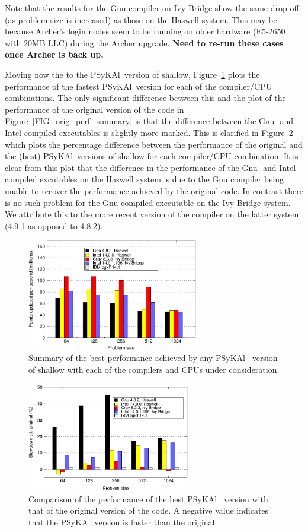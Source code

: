 \documentclass[journal]{IEEEtran}
\newcommand{\psykal}{{PS}y{KA}l\ }
\begin{document}
Note that the results for the Gnu compiler on Ivy Bridge show the same
drop-off (as problem size is increased) as those on the Haswell
system. This may be because Archer's login nodes seem to be running on
older hardware (E5-2650 with 20MB LLC) during the Archer upgrade. {\bf
  Need to re-run these cases once Archer is back up.}

Moving now the to the \psykal version of shallow,
Figure~\ref{FIG_best_psykal_perf_summary} plots the performance of the
fastest \psykal version for each of the compiler/CPU combinations. The
only significant difference between this and the plot of the
performance of the original version of the code in
Figure~\ref{FIG_orig_perf_summary} is that the difference between the
Gnu- and Intel-compiled executables is slightly more marked. This is
clarified in Figure~\ref{FIG_slowdown_summary} which plots the
percentage difference between the performance of the original and the
(best) \psykal versions of shallow for each compiler/CPU combination.
It is clear from this plot that the difference in the performance of
the Gnu- and Intel-compiled excutables on the Haswell system is due to
the Gnu compiler being unable to recover the performance achieved by
the original code. In contrast there is no such problem for the
Gnu-compiled executable on the Ivy Bridge system. We attribute this to
the more recent version of the compiler on the latter system (4.9.1 as
opposed to 4.8.2).

\begin{figure}[!t]
\centering
\includegraphics[width=7.5cm]{best_psykal_summary}
\caption{Summary of the best performance achieved by any \psykal 
version of shallow with each of the compilers and CPUs under 
consideration.}
\label{FIG_best_psykal_perf_summary}
\end{figure}

\begin{figure}[!t]
\centering
\includegraphics[width=2.8in]{slowdown_summary}
\caption{Comparison of the performance of the best \psykal
version with that of the original version of the code. A negative value 
indicates that the \psykal version is faster than the original.}
\label{FIG_slowdown_summary}
\end{figure}
\end{document}
